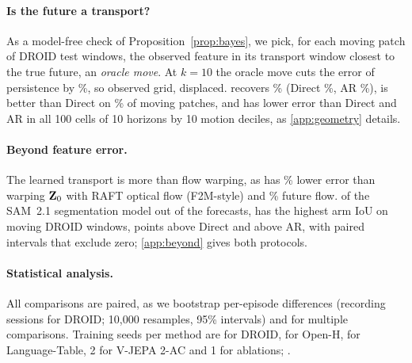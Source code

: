\paragraph{Is the future a transport?} As a model-free check of Proposition~\ref{prop:bayes}, we pick, for each moving
patch of \geoWindows{} DROID test windows, the observed feature in its transport window closest to the true future, an
\emph{oracle move}.
%
At $k{=}10$ the oracle move cuts the error of persistence by \geoOracleRed\%, so 
observed grid, displaced.
%
\ours{} recovers \geoShareShift\%  (Direct \geoShareDirect\%, AR \geoShareAR\%), is better than
Direct on \geoWinDirect\% of moving patches, and has lower error than Direct and AR in all 100
cells of 10 horizons by 10 motion deciles, as \cref{app:geometry} details.

\paragraph{Beyond feature error.} The learned transport is more than flow warping, as \ours{} has \flowVsWarp\%
lower error than warping $\mathbf{Z}_0$ with RAFT optical flow (F2M-style) and \flowVsOracle\% 
future flow.
%
 of the SAM~2.1 segmentation model out of the forecasts, \ours{} has the highest arm IoU on moving DROID windows,
\segDroidMovGainDi{} points above Direct and \segDroidMovGainAR{} above AR, with paired intervals that
exclude zero; \cref{app:beyond} gives both protocols.

\paragraph{Statistical analysis.} \label{sec:stats} All comparisons are paired, as we bootstrap per-episode
differences (recording sessions for DROID; 10{,}000 resamples, 95\% intervals) and  for multiple comparisons.
%
Training seeds per method are \droidSeeds{} for DROID, \hamlynSeeds{} for Open-H, \ltSeeds{} for Language-Table, 2 for
V-JEPA 2-AC and 1 for ablations; .

